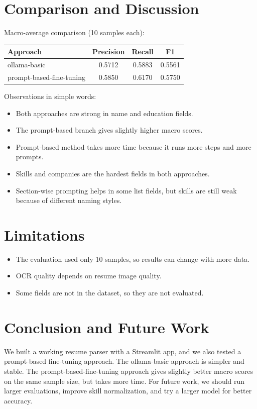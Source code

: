 \documentclass[11pt,a4paper]{article}
\begin{document}
\section{Comparison and Discussion}
Macro-average comparison (10 samples each):
\begin{center}
\begin{tabular}{lccc}
\toprule
Approach & Precision & Recall & F1 \\
\midrule
ollama-basic & 0.5712 & 0.5883 & 0.5561 \\
prompt-based-fine-tuning & 0.5850 & 0.6170 & 0.5750 \\
\bottomrule
\end{tabular}
\end{center}

Observations in simple words:
\begin{itemize}
\item Both approaches are strong in name and education fields.
\item The prompt-based branch gives slightly higher macro scores.
\item Prompt-based method takes more time because it runs more steps and more prompts.
\item Skills and companies are the hardest fields in both approaches.
\item Section-wise prompting helps in some list fields, but skills are still weak because of different naming styles.
\end{itemize}

\section{Limitations}
\begin{itemize}
\item The evaluation used only 10 samples, so results can change with more data.
\item OCR quality depends on resume image quality.
\item Some fields are not in the dataset, so they are not evaluated.
\end{itemize}

\section{Conclusion and Future Work}
We built a working resume parser with a Streamlit app, and we also tested a prompt-based fine-tuning approach. The ollama-basic approach is simpler and stable. The prompt-based-fine-tuning approach gives slightly better macro scores on the same sample size, but takes more time. For future work, we should run larger evaluations, improve skill normalization, and try a larger model for better accuracy.
\end{document}
